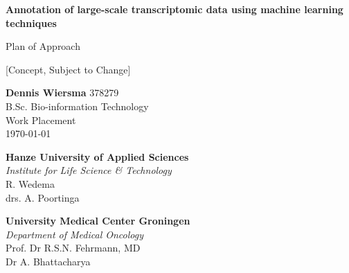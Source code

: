 \begin{titlepage}
    \begin{center}
        \textbf{\LARGE Annotation of large-scale transcriptomic data using machine learning techniques}

        \vspace{0.5cm}
        \Large Plan of Approach

        \vspace{0.2cm}
        \normalsize [Concept, Subject to Change]

        \vspace{1.5cm}

    \end{center}

    \vfill

    \begin{flushright}
        \textbf{Dennis Wiersma} 378279 \\
        B.Sc. Bio-information Technology \\
        Work Placement \\
        \longdate
        \today

        \vspace{1cm}

        \textbf{Hanze University of Applied Sciences} \\
        \textit{Institute for Life Science \& Technology} \\
        R. Wedema \\
        drs. A. Poortinga

        \textbf{University Medical Center Groningen} \\
        \textit{Department of Medical Oncology} \\
        Prof. Dr R.S.N. Fehrmann, MD \\
        Dr A. Bhattacharya

    \end{flushright}
\end{titlepage}
